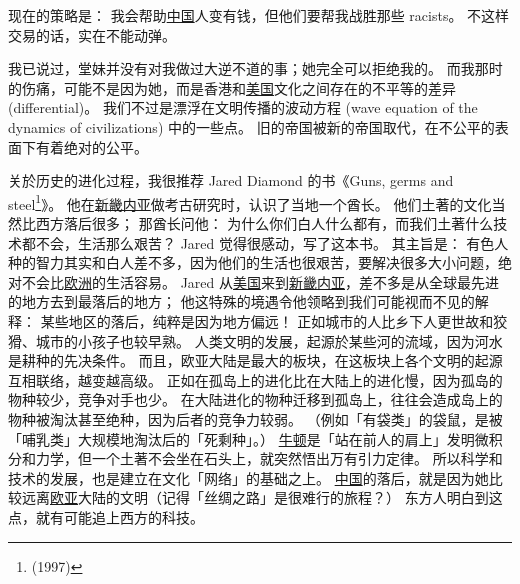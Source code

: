 \documentclass[12pt]{report}
\begin{document}
{现在的策略是： 我会帮助\uline{中国}人变有钱，但他们要帮我战胜那些 racists。 不这样交易的话，实在不能动弹。

我已说过，堂妹并没有对我做过大逆不道的事；她完全可以拒绝我的。 而我那时的伤痛，可能不是因为她，而是香港和\uline{美国}文化之间存在的不平等的差异 (differential)。 我们不过是漂浮在文明传播的波动方程 (wave equation of the dynamics of civilizations) 中的一些点。 旧的帝国被新的帝国取代，在不公平的表面下有着绝对的公平。

关於历史的进化过程，我很推荐 Jared Diamond 的书《Guns, germs and steel\footnote{(1997)}》。  他在\uline{新畿内亚}做考古研究时，认识了当地一个酋长。  他们土著的文化当然比西方落后很多； 那酋长问他： 为什么你们白人什么都有，而我们土著什么技术都不会，生活那么艰苦？  Jared 觉得很感动，写了这本书。  其主旨是： 有色人种的智力其实和白人差不多，因为他们的生活也很艰苦，要解决很多大小问题，绝对不会比\uline{欧洲}的生活容易。  Jared 从\uline{美国}来到\uline{新畿内亚}，差不多是从全球最先进的地方去到最落后的地方； 他这特殊的境遇令他领略到我们可能视而不见的解释： 某些地区的落后，纯粹是因为地方偏远！  正如城市的人比乡下人更世故和狡猾、城市的小孩子也较早熟。  人类文明的发展，起源於某些河的流域，因为河水是耕种的先决条件。 而且，欧亚大陆是最大的板块，在这板块上各个文明的起源互相联络，越变越高级。 正如在孤岛上的进化比在大陆上的进化慢，因为孤岛的物种较少，竞争对手也少。 在大陆进化的物种迁移到孤岛上，往往会造成岛上的物种被淘汰甚至绝种，因为后者的竞争力较弱。 （例如「有袋类」的袋鼠，是被「哺乳类」大规模地淘汰后的「死剩种」。）  \uline{牛顿}是「站在前人的肩上」发明微积分和力学，但一个土著不会坐在石头上，就突然悟出万有引力定律。 所以科学和技术的发展，也是建立在文化「网络」的基础之上。 \uline{中国}的落后，就是因为她比较远离\uline{欧亚}大陆的文明（记得「丝绸之路」是很难行的旅程？） 东方人明白到这点，就有可能追上西方的科技。

}
\end{document}
